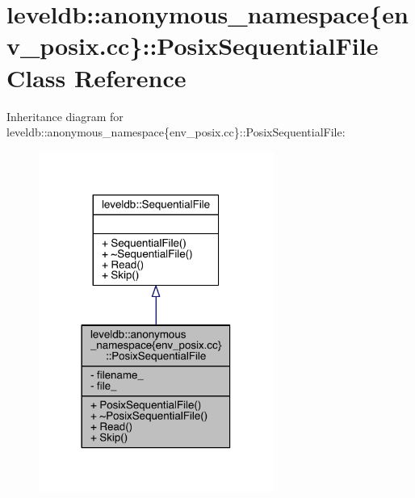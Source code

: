 \hypertarget{classleveldb_1_1anonymous__namespace_02env__posix_8cc_03_1_1_posix_sequential_file}{}\section{leveldb\+:\+:anonymous\+\_\+namespace\{env\+\_\+posix.\+cc\}\+:\+:Posix\+Sequential\+File Class Reference}
\label{classleveldb_1_1anonymous__namespace_02env__posix_8cc_03_1_1_posix_sequential_file}


Inheritance diagram for leveldb\+:\+:anonymous\+\_\+namespace\{env\+\_\+posix.\+cc\}\+:\+:Posix\+Sequential\+File\+:
\nopagebreak
\begin{figure}[H]
\begin{center}
\leavevmode
\includegraphics[width=218pt]{classleveldb_1_1anonymous__namespace_02env__posix_8cc_03_1_1_posix_sequential_file__inherit__graph}
\end{center}
\end{figure}


